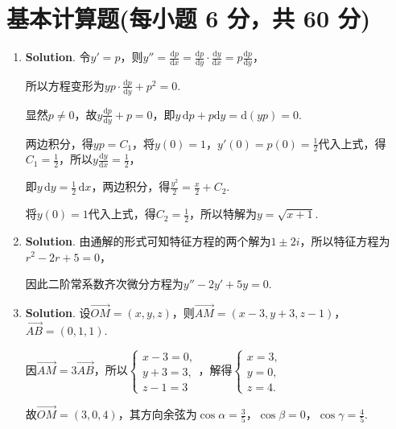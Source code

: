 \documentclass[../Main.tex]{subfiles}
\begin{document}
\section{基本计算题(每小题 6 分，共 60 分)}
\begin{enumerate}
    \item \textbf{Solution}. 令$y'=p$，则$y''=\frac{\mathrm{d}p}{\mathrm{d}x}=\frac{\mathrm{d}p}{\mathrm{d}y}
              \cdot \frac{\mathrm{d}y}{\mathrm{d}x}= p\frac{\mathrm{d}p}{\mathrm{d}y}$，

          所以方程变形为$y p \cdot \frac{\mathrm{d}p}{\mathrm{d}y}+p^{2}=0$.

          显然$p\neq0$，故$y\frac{\mathrm{d}p}{\mathrm{d}y}+p=0$，即$y\,\mathrm{d}p + p
              \mathrm{d}y = \mathrm{d}(yp) = 0$.

          两边积分，得$yp = C_{1}$，将$y(0)=1$，$y'(0)=p(0)=\frac{1}{2}$代入上式，得$C
                  _{1}= \frac{1}{2}$，所以$y\frac{\mathrm{d}y}{\mathrm{d}x}= \frac{1}{2}$，

          即$y\,\mathrm{d}y = \frac{1}{2}\,\mathrm{d}x$，两边积分，得$\frac{y^{2}}{2}= \frac{x}{2}
              + C_{2}$.

          将$y(0)=1$代入上式，得$C_{2}= \frac{1}{2}$，所以特解为$y= \sqrt{x+1}$.

    \item \textbf{Solution}. 由通解的形式可知特征方程的两个解为$1\pm 2i$，所以特征方程为$r
                  ^{2}-2r+5=0$，

          因此二阶常系数齐次微分方程为$y''-2y'+5y=0$.

    \item \textbf{Solution}. 设$\overrightarrow{OM}= (x,y,z)$，则$\overrightarrow
              {AM}= (x-3,y+3,z-1)$，$\overrightarrow{AB}= (0,1,1)$.

          因$\overrightarrow{AM}= 3\overrightarrow{AB}$，所以$\begin{cases}
                  x-3=0, \\
                  y+3=3, \\
                  z-1=3
              \end{cases}$，解得$\begin{cases}
                  x=3, \\
                  y=0, \\
                  z=4.
              \end{cases}$

          故$\overrightarrow{OM}= (3,0,4)$，其方向余弦为$\cos \alpha = \frac{3}{5}$，$\cos
              \beta = 0$，$\cos \gamma = \frac{4}{5}$.


\end{enumerate}
\end{document}
